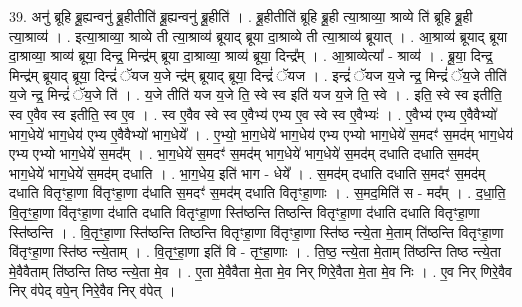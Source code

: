 \documentclass[17pt]{extarticle}
\begin{document}
39. अनु॑ ब्रूहि ब्रू॒ह्यन्वनु॑ ब्रू॒हीतीति॑ ब्रू॒ह्यन्वनु॑ ब्रू॒हीति॑ । . ब्रू॒हीतीति॑ ब्रूहि ब्रू॒ही त्या॒श्राव्या॒ श्राव्ये ति॑ ब्रूहि ब्रू॒ही त्या॒श्राव्य॑ । . इत्या॒श्राव्या॒ श्राव्ये ती त्या॒श्राव्य॑ ब्रूयाद् ब्रूया दा॒श्राव्ये ती त्या॒श्राव्य॑ ब्रूयात् । . आ॒श्राव्य॑ ब्रूयाद् ब्रूया दा॒श्राव्या॒ श्राव्य॑ ब्रूया॒ दिन्द्र॒ मिन्द्र॑म् ब्रूया दा॒श्राव्या॒ श्राव्य॑ ब्रूया॒ दिन्द्र᳚म् । . आ॒श्राव्येत्या᳚ - श्राव्य॑ । . ब्रू॒या॒ दिन्द्र॒ मिन्द्र॑म् ब्रूयाद् ब्रूया॒ दिन्द्रं॑ ॅयज य॒जे न्द्र॑म् ब्रूयाद् ब्रूया॒ दिन्द्रं॑ ॅयज । . इन्द्रं॑ ॅयज य॒जे न्द्र॒ मिन्द्रं॑ ॅय॒जे तीति॑ य॒जे न्द्र॒ मिन्द्रं॑ ॅय॒जे ति॑ । . य॒जे तीति॑ यज य॒जे ति॒ स्वे स्व इति॑ यज य॒जे ति॒ स्वे । . इति॒ स्वे स्व इतीति॒ स्व ए॒वैव स्व इतीति॒ स्व ए॒व । . स्व ए॒वैव स्वे स्व ए॒वैभ्य॑ एभ्य ए॒व स्वे स्व ए॒वैभ्यः॑ । . ए॒वैभ्य॑ एभ्य ए॒वैवैभ्यो॑ भाग॒धेये॑ भाग॒धेय॑ एभ्य ए॒वैवैभ्यो॑ भाग॒धेये᳚ । . ए॒भ्यो॒ भा॒ग॒धेये॑ भाग॒धेय॑ एभ्य एभ्यो भाग॒धेये॑ स॒मदꣳ॑ स॒मद॑म् भाग॒धेय॑ एभ्य एभ्यो भाग॒धेये॑ स॒मद᳚म् । . भा॒ग॒धेये॑ स॒मदꣳ॑ स॒मद॑म् भाग॒धेये॑ भाग॒धेये॑ स॒मद॑म् दधाति दधाति स॒मद॑म् भाग॒धेये॑ भाग॒धेये॑ स॒मद॑म् दधाति । . भा॒ग॒धेय॒ इति॑ भाग - धेये᳚ । . स॒मद॑म् दधाति दधाति स॒मदꣳ॑ स॒मद॑म् दधाति वितृꣳहा॒णा वि॑तृꣳहा॒णा द॑धाति स॒मदꣳ॑ स॒मद॑म् दधाति वितृꣳहा॒णाः । . स॒मद॒मिति॑ स - मद᳚म् । . द॒धा॒ति॒ वि॒तृꣳ॒॒हा॒णा वि॑तृꣳहा॒णा द॑धाति दधाति वितृꣳहा॒णा स्ति॑ष्ठन्ति तिष्ठन्ति वितृꣳहा॒णा द॑धाति दधाति वितृꣳहा॒णा स्ति॑ष्ठन्ति । . वि॒तृꣳ॒॒हा॒णा स्ति॑ष्ठन्ति तिष्ठन्ति वितृꣳहा॒णा वि॑तृꣳहा॒णा स्ति॑ष्ठ न्त्ये॒ता मे॒ताम् ति॑ष्ठन्ति वितृꣳहा॒णा वि॑तृꣳहा॒णा स्ति॑ष्ठ न्त्ये॒ताम् । . वि॒तृꣳ॒॒हा॒णा इति॑ वि - तृꣳ॒॒हा॒णाः । . ति॒ष्ठ॒ न्त्ये॒ता मे॒ताम् ति॑ष्ठन्ति तिष्ठ न्त्ये॒ता मे॒वैवैताम् ति॑ष्ठन्ति तिष्ठ न्त्ये॒ता मे॒व । . ए॒ता मे॒वैवैता मे॒ता मे॒व निर् णिरे॒वैता मे॒ता मे॒व निः । . ए॒व निर् णिरे॒वैव निर् व॑पेद् वपे॒न् निरे॒वैव निर् व॑पेत् । \newline
\pagebreak
{}
\end{document}
